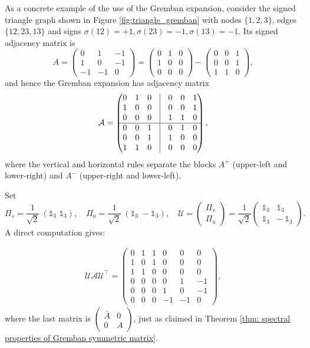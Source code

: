 \documentclass[reprint,onecolumn]{article}
\newcommand{\mc}[1]{\mathcal{#1}}
\newcommand{\1}{\mathbb{1}}
\newcommand{\0}{\mathbf{0}}
\begin{document}
As a concrete example of the use of the Gremban expansion, consider the signed triangle graph shown in Figure \ref{fig:triangle_gremban} with nodes \(\{1,2,3\}\), edges $\{12,23,13\}$ and signs
\(
\sigma(12)=+1, \sigma(23)=-1, \sigma(13)=-1.
\)
Its signed adjacency matrix is
\[
A =
\begin{pmatrix}
0 & 1 & -1\\
1 & 0 & -1\\
-1 & -1 & 0
\end{pmatrix} = 
\begin{pmatrix}
0 & 1 & 0\\
1 & 0 & 0\\
0 & 0 & 0
\end{pmatrix} - 
\begin{pmatrix}
0 & 0 & 1\\
0 & 0 & 1\\
1 & 1 & 0
\end{pmatrix} ,
\]
and hence the Gremban expansion has adjacency matrix
\[
\mc A
= 
\begin{pmatrix}
0 & 1 & 0 & \vrule & 0 & 0 & 1\\
1 & 0 & 0 & \vrule & 0 & 0 & 1\\
0 & 0 & 0 & \vrule & 1 & 1 & 0\\\hline
0 & 0 & 1 & \vrule & 0 & 1 & 0\\
0 & 0 & 1 & \vrule & 1 & 0 & 0\\
1 & 1 & 0 & \vrule & 0 & 0 & 0
\end{pmatrix},
\]
where the vertical and horizontal rules separate the blocks \(A^+\) (upper-left and lower-right) and \(A^-\) (upper-right and lower-left).

Set
\[
\Pi_{s} =\frac1{\sqrt2}\ (\1_3\;\1_3),
\quad
\Pi_{a}   =\frac1{\sqrt2}\ (\1_3\;-\1_3),
\quad
\mc U   = \begin{pmatrix}\Pi_{s}\\[2pt]\Pi_{a}\end{pmatrix}
= \frac1{\sqrt2}
\begin{pmatrix}
\1_3 & \1_3\\
\1_3 & -\ \1_3
\end{pmatrix}.
\]
A direct computation gives:

\begin{align}
\mc U \mc A \mc U^\top = 
\begin{pmatrix}
0 & 1 & 1 & 0 & 0 & 0\\
1 & 0 & 1 & 0 & 0 & 0\\
1 & 1 & 0 & 0 & 0 & 0\\
0 & 0 & 0 & 0 & 1 & -1\\
0 & 0 & 0 & 1 & 0 & -1\\
0 & 0 & 0 & -1 & -1 & 0
\end{pmatrix},
\end{align}
where the last matrix is \(\begin{pmatrix}
\bar A & 0\\
0      & A
\end{pmatrix}\), just as claimed in Theorem \ref{thm: spectral properties of Gremban symmetric matrix}. 
\end{document}
